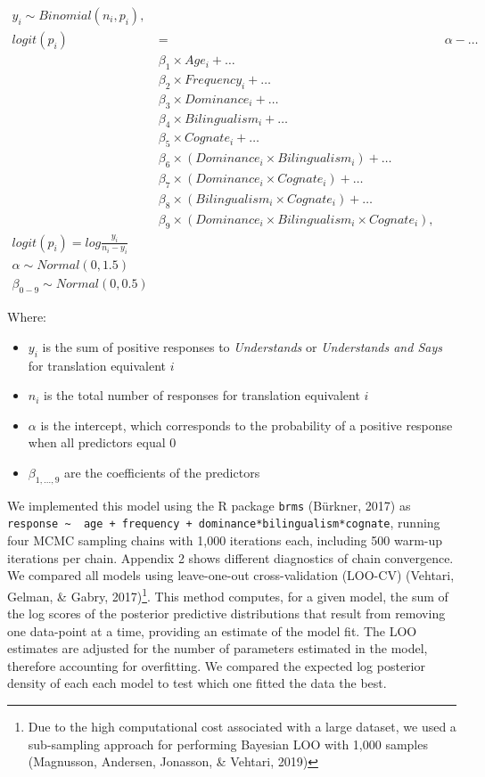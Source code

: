 \documentclass[
  english,
  man,man,floatsintext]{apa6}
\providecommand{\tightlist}{%
  \setlength{\itemsep}{0pt}\setlength{\parskip}{0pt}}
\begin{document}
\[
\begin{aligned}
y_i \sim Binomial(n_i, p_i), \\
logit(p_i) &=& \alpha - \dots \\
& \beta_1 \times Age_i + \dots \\
& \beta_2 \times Frequency_i + \dots \\
& \beta_3 \times Dominance_i + \dots \\
& \beta_4 \times Bilingualism_i + \dots \\
& \beta_5 \times Cognate_i + \dots \\
& \beta_6 \times (Dominance_i \times Bilingualism_i) + \dots \\
& \beta_7 \times (Dominance_i \times Cognate_i) + \dots \\
& \beta_8 \times (Bilingualism_i \times Cognate_i) + \dots \\
& \beta_9 \times (Dominance_i \times Bilingualism_i \times Cognate_i), \\
logit(p_i) = log\frac{y_i}{n_i-y_i} \\
\alpha \sim Normal(0, 1.5) \\
\beta_{0-9} \sim Normal(0, 0.5)
\end{aligned}
\]

Where:

\begin{itemize}
\tightlist
\item
  \(y_i\) is the sum of positive responses to \emph{Understands} or \emph{Understands and Says} for translation equivalent \(i\)
\item
  \(n_i\) is the total number of responses for translation equivalent \(i\)
\item
  \(\alpha\) is the intercept, which corresponds to the probability of a positive response when all predictors equal 0
\item
  \(\beta_{1, \dots, 9}\) are the coefficients of the predictors
\end{itemize}

We implemented this model using the R package \texttt{brms} (Bürkner, 2017) as \texttt{response\ \textasciitilde{}\ \ age\ +\ frequency\ +\ dominance*bilingualism*cognate}, running four MCMC sampling chains with 1,000 iterations each, including 500 warm-up iterations per chain. Appendix 2 shows different diagnostics of chain convergence. We compared all models using leave-one-out cross-validation (LOO-CV) (Vehtari, Gelman, \& Gabry, 2017)\footnote{Due to the high computational cost associated with a large dataset, we used a sub-sampling approach for performing Bayesian LOO with 1,000 samples (Magnusson, Andersen, Jonasson, \& Vehtari, 2019)}. This method computes, for a given model, the sum of the log scores of the posterior predictive distributions that result from removing one data-point at a time, providing an estimate of the model fit. The LOO estimates are adjusted for the number of parameters estimated in the model, therefore accounting for overfitting. We compared the expected log posterior density of each each model to test which one fitted the data the best.
\end{document}
